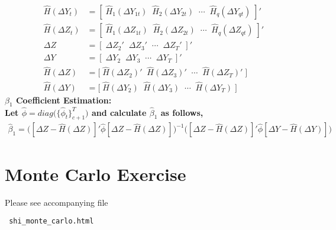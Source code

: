 \documentclass[10pt]{article}
\begin{document}
%
 \begin{align*}
   \hat{H}(\Delta Y_t)  &= [ \; \hat{H}_1(\Delta Y_{1t}) \;\; \hat{H}_2(\Delta Y_{2t}) \;\; \cdots \;\; \hat{H}_q(\Delta Y_{qt}) \; ]'\\
%
\hat{H}(\Delta Z_t)  &= [ \; \hat{H}_1(\Delta Z_{1t}) \;\; \hat{H}_2(\Delta Z_{2t}) \;\; \cdots \;\; \hat{H}_q(\Delta Z_{qt}) \; ]'\\
%
\Delta Z &= [ \; \Delta Z_{2}' \;\; \Delta Z_{3}' \;\; \cdots \;\; \Delta Z_{T}' \;]' \\
%
 \Delta Y &= [ \; \Delta Y_{2} \;\; \Delta Y_{3} \;\; \cdots \;\; \Delta Y_{T} \;]' \\
%
\hat{H}(\Delta Z) &= \big[\; \hat{H}(\Delta Z_{2})' \;\; \hat{H}(\Delta Z_{3})' \;\;\cdots \;\; \hat{H}(\Delta Z_{T})' \; \big] \\
%
 \hat{H}(\Delta Y) &= \big[\; \hat{H}(\Delta Y_{2}) \;\; \hat{H}(\Delta Y_{3}) \;\;\cdots \;\; \hat{H}(\Delta Y_{T}) \; \big]
\end{align*}
%
\noindent \bf $\beta_1$ Coefficient Estimation:\rm \\
%
 Let $\hat{\phi} = diag\big( \{\hat{\phi}_t\}_{c+1}^T \big)$ and calculate $\hat{\beta}_1$ as follows,
    \begin{align*}
  \hat{\beta}_1 = \Big( [\Delta Z - \hat{H}(\Delta Z)]' \hat{\phi} [\Delta Z - \hat{H}(\Delta Z)] \Big)^{-1} \Big( [\Delta Z - \hat{H}(\Delta Z)]' \hat{\phi} [\Delta Y - \hat{H}(\Delta Y)] \Big)
    \end{align*}
    
\section*{Monte Carlo Exercise}

Please see accompanying file \begin{verbatim} shi_monte_carlo.html \end{verbatim}
    
\end{document}
